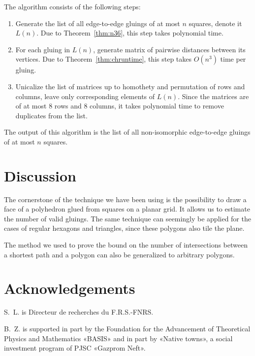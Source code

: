 \documentclass[a4paper,11pt]{article}
\begin{document}
The algorithm consists of the following steps:

\begin{enumerate}
	\item Generate the list of all edge-to-edge gluings of at most $n$ squares,
	denote it $L(n)$. Due to Theorem~\ref{thm:n36}, this step takes polynomial time.
	\item For each gluing in $L(n)$, generate matrix of pairwise distances
	between its vertices. Due to Theorem~\ref{thm:chruntime},
	this step takes $O(n^3)$ time per gluing.
	\item Unicalize the list of matrices up to homothety and permutation of rows and columns, leave only corresponding elements of $L(n)$. Since the matrices are of at most 8 rows and 8 columns, it takes polynomial time to remove duplicates from the list.
\end{enumerate}

The output of this algorithm is the list of all non-isomorphic edge-to-edge gluings of at most $n$ squares.

\section{Discussion}

The cornerstone of the technique we have been using is the possibility to draw a face of a polyhedron glued from squares on a planar grid. It allows us to estimate the number of valid gluings. The same technique can seemingly be applied for the cases of regular hexagons and triangles, since these polygons also tile the plane.

The method we used to prove the bound on the number of intersections between a shortest path and a polygon can also be generalized to arbitrary polygons.

\section*{Acknowledgements}

S.~L. is Directeur de recherches du F.R.S.-FNRS.

B.~Z. is supported in part by the Foundation for the Advancement of Theoretical Physics and Mathematics «BASIS» and in part by «Native towns», a social investment program of PJSC «Gazprom Neft».

{}

\end{document}
